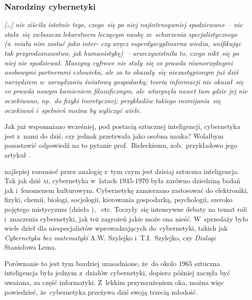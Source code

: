 \documentclass[10pt,t]{beamer}
\begin{document}
\begin{frame}
  \frametitle{Narodziny cybernetyki}



  \textit{[\ldots] nie ziściła istotnie tego, czego~się po niej najintensywniej
    spodziewano~-- nie stała~się zwłaszcza lekarstwem leczącym naukę
    ze~schorzenia specjalistycznego (a~miała nim zostać jako inter- czy
    wręcz superdyscyplinarna wiedza, unifikując tak przyrodoznawstwo, jak
    humanistykę)~-- urzeczywistniła to, czego nikt~się po niej nie
    spodziewał. Maszyny cyfrowe nie stały~się co prawda równorzędnymi
    osobowymi partnerami człowieka, ale za to okazały~się niezastąpionym
    już dziś narzędziem w~zarządzaniu światową gospodarką; teoria
    informacji nie okazał~się co prawda nowym kamieniem filozoficznym,
    ale~wtargnęła nawet tam gdzie jej nie oczekiwano, np.~do fizyki
    teoretycznej; przykładów takiego rozmijania~się oczekiwań i~spełnień
    można by wyliczyć wiele.}

  Jak już wspomniano wcześniej, pod postacią sztucznej inteligencji,
  cybernetyka jest z~nami do dziś, czy jednak przetrwała jako osobna nauka?
  Wolałbym pozostawić odpowiedź na to pytanie prof.~Bieleckiemu,
  zob.~przykładowo jego artykuł
  \parencite{Bielecki-Cybernetyka-Slowniki-spoleczne-Vol-XIII-Ver-2025}.


  najlepiej rozumieć przez analogię z~tym czym jest dzisiaj sztuczna
  inteligencja. Tak jak dziś \textsc{ai}, cybernetyka w~latach
  $1945\text{-}1970$ była zarówno dziedziną badań jak i~fenomenem
  kulturowym. Cybernetykę zamierzano zastosować do elektroniki, fizyki,
  chemii, biologi, socjologii, kierowania gospodarką, psychologii, szeroko
  pojętego mistycyzmu (dzieła
  ), ~etc. Toczyły~się intensywne debaty na temat roli i~znaczenia
  cybernetyki, jak też zagrożeń jakie może ona nieść. W~sprzedaży było
  wiele dzieł dla niespecjalistów wprowadzających do~cybernetyki, takich jak
  \textit{Cybernetyka bez matematyki} A.W. Szylejko i~T.I.~Szylejko, czy
  \textit{Dialogi} Stanisława Lema.



  Porównanie to jest tym bardziej uzasadnione, że~do około $1965$ sztuczna
  inteligencja była jednym z~działów cybernetyki, dopiero później
  zaczęła być uważana, za część informatyki. Z~lekkim przymrużeniem oka,
  można więc powiedzieć, że~cybernetyka przeżywa dziś swoją trzecią młodość.


\end{frame}
\end{document}
